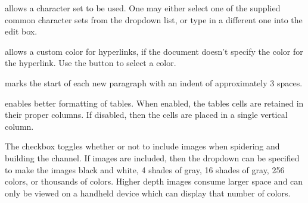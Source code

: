 allows a 
character set to be used. One may either select one of the supplied common 
character sets from the dropdown list, or type in a different one into the 
edit box.


 allows a custom color 
for hyperlinks, if the document doesn't specify the color for the hyperlink. 
Use the  button to select a color. 



 marks the start of 
each new paragraph with an indent of approximately 3 spaces. 

 enables better formatting of
tables. When enabled, the tables cells are retained in their proper columns.
If disabled, then the cells are placed in a single vertical column.


The  checkbox toggles whether or not to include
images when spidering and building the channel. If images are included, then
the  dropdown can be specified to make the images
black and white, 4 shades of gray, 16 shades of gray, 256 colors, or thousands
of colors. Higher depth images consume larger space and can only be viewed on a
handheld device which can display that number of colors.

